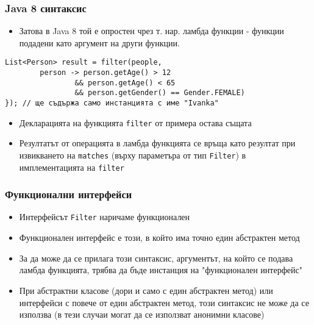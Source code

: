 \documentclass[ignorenonframetext, hyperref=unicode,compress,pdflatex]{beamer}
\begin{document}
\begin{frame}[containsverbatim]\frametitle{Java 8 синтаксис}
\begin{itemize}
  \item Затова в Java 8 той е опростен чрез т. нар. ламбда функции - функции
  подадени като аргумент на други функции.
\end{itemize}
\begin{lstlisting}
List<Person> result = filter(people,
		person -> person.getAge() > 12
				&& person.getAge() < 65
				&& person.getGender() == Gender.FEMALE)
}); // ще съдържа само инстанцията с име "Ivanka"
\end{lstlisting}
\begin{itemize}
  \item Декларацията на функцията \lstinline{filter} от примера остава същата
  \item Резултатът от операцията в ламбда функцията се връща като резултат при
  извикването на \lstinline{matches} (върху параметъра от тип
  \lstinline{Filter}) в имплементацията на \lstinline{filter}
\end{itemize}
\end{frame}

\begin{frame}[containsverbatim]\frametitle{Функционални интерфейси}
\begin{itemize}
  \item Интерфейсът \lstinline{Filter} наричаме функционален
  \item Функционален интерфейс е този, в който има точно един абстрактен метод
  \item За да може да се прилага този синтаксис, аргументът, на който се подава
  ламбда функцията, трябва да бъде инстанция на "функционален интерфейс"
  \item При абстрактни класове (дори и само с един абстрактен метод) или
  интерфейси с повече от един абстрактен метод, този синтаксис не може да се
  използва (в тези случаи могат да се използват анонимни класове)
\end{itemize}
\end{frame}
\end{document}
